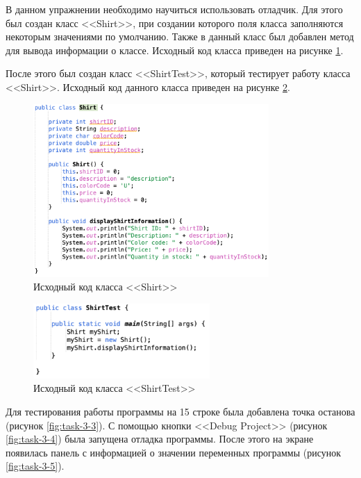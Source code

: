 \documentclass[a4paper, 14pt]{extarticle}
\begin{document}
В данном упражнении необходимо научиться использовать отладчик. Для этого был
создан класс <<\foreignlanguage{english}{Shirt}>>, при создании которого поля
класса заполняются некоторым значениями по умолчанию. Также в данный класс был
добавлен метод для вывода информации о классе. Исходный код класса приведен на
рисунке \ref{fig:task-3-1}.

После этого был создан класс <<\foreignlanguage{english}{ShirtTest}>>, который
тестирует работу класса <<\foreignlanguage{english}{Shirt}>>. Исходный код
данного класса приведен на рисунке \ref{fig:task-3-2}.

\begin{figure}[H]
  \centering
  \includegraphics[width=0.8\textwidth]{images/task-3/1.png}
  \caption{Исходный код класса <<\foreignlanguage{english}{Shirt}>>}
  \label{fig:task-3-1}
\end{figure}

\begin{figure}[H]
  \centering
  \includegraphics[width=0.6\textwidth]{images/task-3/2.png}
  \caption{Исходный код класса <<\foreignlanguage{english}{ShirtTest}>>}
  \label{fig:task-3-2}
\end{figure}

Для тестирования работы программы на 15 строке была добавлена точка останова
(рисунок \ref{fig:task-3-3}). С помощью кнопки <<\foreignlanguage{english}{Debug
  Project}>> (рисунок \ref{fig:task-3-4}) была запущена отладка программы. После
этого на экране появилась панель с информацией о значении переменных программы
(рисунок \ref{fig:task-3-5}).
\end{document}
